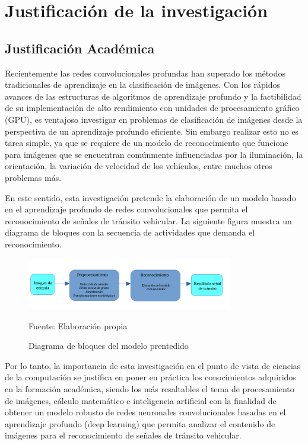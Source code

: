 	
\section{Justificación de la investigación} 

	\subsection{Justificación Académica}

	Recientemente las redes convolucionales profundas han superado los métodos tradicionales de aprendizaje en la clasificación de imágenes. Con los rápidos avances de las estructuras de algoritmos de aprendizaje profundo y la factibilidad de su implementación de alto rendimiento con unidades de procesamiento gráfico (GPU), es ventajoso investigar en problemas de clasificación de imágenes desde la perspectiva de un aprendizaje profundo eficiente. Sin embargo realizar esto no es tarea simple, ya que se requiere de un modelo de reconocimiento que funcione para imágenes que se encuentran comúnmente influenciadas por la iluminación, la orientación, la variación de velocidad de los vehículos, entre muchos otros problemas más.  \vskip 0.2cm

	En este sentido, esta investigación pretende la elaboración de un modelo basado en el aprendizaje profundo de redes convolucionales que permita el reconocimiento de señales de tránsito vehicular. La siguiente figura muestra un diagrama de bloques con la secuencia de actividades que demanda el reconocimiento.

	\begin{figure}[H]
	\begin{center}
	\includegraphics[width=0.8\textwidth]{images/intro/bloque}
	\end{center}
	\begin{center}
	\caption{\small{Diagrama de bloques del modelo prentedido}}
	{\small{Fuente: Elaboración propia}}
	\end{center}
	\vspace{-1.5em}
	\end{figure}


	Por lo tanto, la importancia de esta investigación en el punto de vista de ciencias de la computación se justifica en poner en práctica los conocimientos adquiridos en la formación académica, siendo los más resaltables el tema de procesamiento de imágenes, cálculo matemático e inteligencia artificial con la finalidad de obtener un modelo robusto de redes neuronales convolucionales basadas en el aprendizaje profundo (deep learning) que permita analizar el contenido de imágenes para el reconocimiento de señales de tránsito vehicular. 


